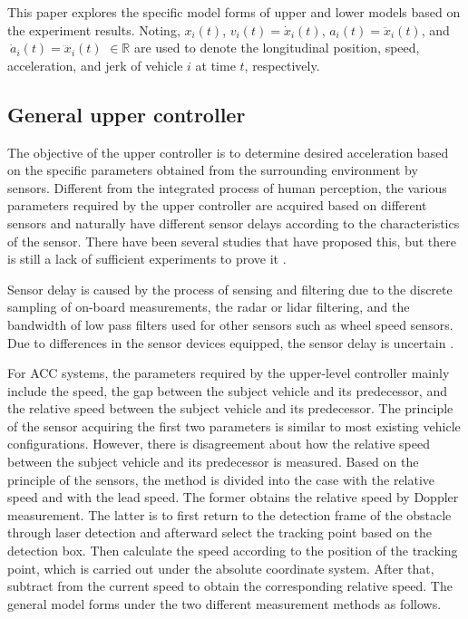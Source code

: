 \documentclass[a4paper]{cas-sc}
\begin{document}
This paper explores the specific model forms of upper and lower models based on the experiment results. Noting, $x_i\left(t\right)$, $v_i\left(t\right)={\dot{x}}_i\left(t\right)$, $a_i\left(t\right)={\ddot{x}}_i\left(t\right)$, and $\ {\dot{a}}_i\left(t\right)={\dddot{x}}_i\left(t\right)$ $\in\mathbb{R}$ are used to denote the longitudinal position, speed, acceleration, and jerk of vehicle $i$ at time $t$, respectively.

\subsection{General upper controller}
\label{Section 2.2}

The objective of the upper controller is to determine desired acceleration based on the specific parameters obtained from the surrounding environment by sensors. Different from the integrated process of human perception, the various parameters required by the upper controller are acquired based on different sensors and naturally have different sensor delays according to the characteristics of the sensor. There have been several studies that have proposed this, but there is still a lack of sufficient experiments to prove it \citep{Ngoduy2013a,Yao2021}.

Sensor delay is caused by the process of sensing and filtering due to the discrete sampling of on-board measurements, the radar or lidar filtering, and the bandwidth of low pass filters used for other sensors such as wheel speed sensors. Due to differences in the sensor devices equipped, the sensor delay is uncertain \citep{Loke2019}.

For ACC systems, the parameters required by the upper-level controller mainly include the speed, the gap between the subject vehicle and its predecessor, and the relative speed between the subject vehicle and its predecessor. The principle of the sensor acquiring the first two parameters is similar to most existing vehicle configurations. However, there is disagreement about how the relative speed between the subject vehicle and its predecessor is measured. Based on the principle of the sensors, the method is divided into the case with the relative speed and with the lead speed. The former obtains the relative speed by Doppler measurement. The latter is to first return to the detection frame of the obstacle through laser detection and afterward select the tracking point based on the detection box. Then calculate the speed according to the position of the tracking point, which is carried out under the absolute coordinate system. After that, subtract from the current speed to obtain the corresponding relative speed. The general model forms under the two different measurement methods as follows.
\end{document}
